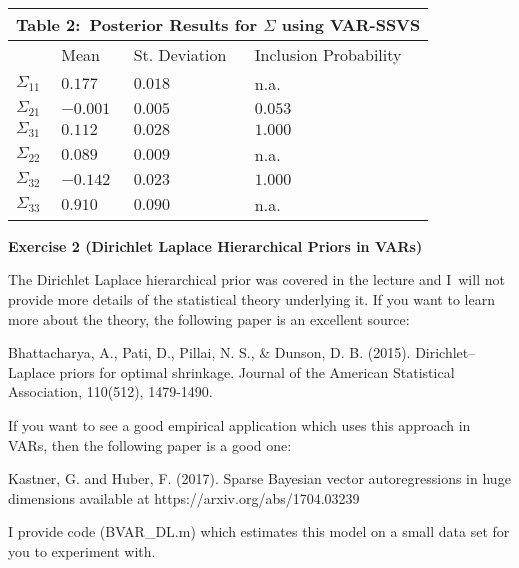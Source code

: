 \documentclass{article}
\begin{document}
\begin{center}
\begin{tabular}{|l|l|l|l|}
\hline
\multicolumn{4}{|l|}{Table 2:\ Posterior Results for $\Sigma $ using VAR-SSVS
} \\ \hline
& Mean & St. Deviation & Inclusion Probability \\ \hline
$\Sigma _{11}$ & $0.177$ & $0.018$ & n.a. \\ \hline
$\Sigma _{21}$ & $-0.001$ & $0.005$ & $0.053$ \\ \hline
$\Sigma _{31}$ & $0.112$ & $0.028$ & $1.000$ \\ \hline
$\Sigma _{22}$ & $0.089$ & $0.009$ & n.a. \\ \hline
$\Sigma _{32}$ & $-0.142$ & $0.023$ & $1.000$ \\ \hline
$\Sigma _{33}$ & $0.910$ & $0.090$ & n.a. \\ \hline
\end{tabular}

\newpage 
\end{center}

\textbf{Exercise 2 (Dirichlet Laplace Hierarchical Priors in VARs)}

The Dirichlet Laplace hierarchical prior was covered in the lecture and I\
will not provide more details of the statistical theory underlying it. If
you want to learn more about the theory, the following paper is an excellent
source:

Bhattacharya, A., Pati, D., Pillai, N. S., \& Dunson, D. B. (2015).
Dirichlet--Laplace priors for optimal shrinkage. Journal of the American
Statistical Association, 110(512), 1479-1490.

If you want to see a good empirical application which uses this approach in
VARs, then the following paper is a good one:

Kastner, G. and Huber, F. (2017). Sparse Bayesian vector autoregressions in
huge dimensions available at https://arxiv.org/abs/1704.03239

I provide code (BVAR\_DL.m) which estimates this model on a small data set
for you to experiment with. 

\bigskip
\end{document}
